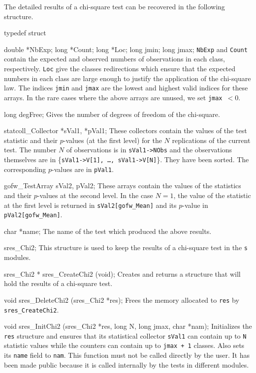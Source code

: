 The detailed results of a chi-square test can be recovered in the
following  structure.

\code

typedef struct {

   double *NbExp;
   long *Count;
   long *Loc;
   long jmin;
   long jmax;
\endcode
 \tabb
  {\tt NbExp} and {\tt Count} contain the expected and
  observed numbers of observations in each class, respectively.
  {\tt Loc} give the classes
  redirections which ensure that the expected numbers in each class
  are large enough to justify the application of the chi-square law.
  The indices {\tt jmin} and {\tt jmax} are the lowest
  and highest valid indices for these arrays. In the rare cases where
  the above arrays are unused, we set {\tt jmax }$< 0$.
 \endtabb
\code

   long degFree;
\endcode
 \tabb
  Gives the number of degrees of freedom of the chi-square.
 \endtabb
\code

   statcoll_Collector *sVal1, *pVal1;
\endcode
 \tabb
  These collectors contain the values of the test statistic and their
  $p$-values  (at the first level) for the $N$ replications of the current
  test. The number $N$ of observations is in {\tt sVal1->NObs} and the
  observations themselves are in \{{\tt sVal1->V[1], \ldots, sVal1->V[N]}\}.
   They have been sorted. The corresponding $p$-values are in {\tt pVal1}.
 \endtabb
\code

   gofw_TestArray sVal2, pVal2;
\endcode
 \tabb
  These arrays contain the values of the statistics and their $p$-values
  at the second level. In the case $N=1$, the value of the  statistic at
  the first level is returned in {\tt sVal2[gofw\_Mean]} and its $p$-value
  in {\tt pVal2[gofw\_Mean]}.
 \endtabb
\code

   char *name;
\endcode
 \tabb
  The name of the test which produced the above results.
 \endtabb
\code

} sres_Chi2;
\endcode
 \tab
  This structure is used to keep the results of a chi-square
  test in the {\tt s} modules.
 \endtab
\code


sres_Chi2 * sres_CreateChi2 (void);
\endcode
 \tab
  Creates and returns a structure that will hold the results
  of a chi-square test.
 \endtab
\code


void sres_DeleteChi2 (sres_Chi2 *res);
\endcode
 \tab
  Frees the memory allocated to {\tt res} by {\tt sres\_CreateChi2}.
 \endtab
\code


void sres_InitChi2 (sres_Chi2 *res, long N, long jmax, char *nam);
\endcode
 \tab
   Initializes the {\tt res} structure and ensures that its statistical
   collector  {\tt sVal1} can contain up to  {\tt N} statistic values
   while the counters can contain up to  {\tt jmax + 1} classes. Also sets
   its  {\tt name} field to  {\tt nam}. This function must not be called
   directly by the user. It has been made public because it is called
   internally by the tests in different modules.
 \endtab
\code


